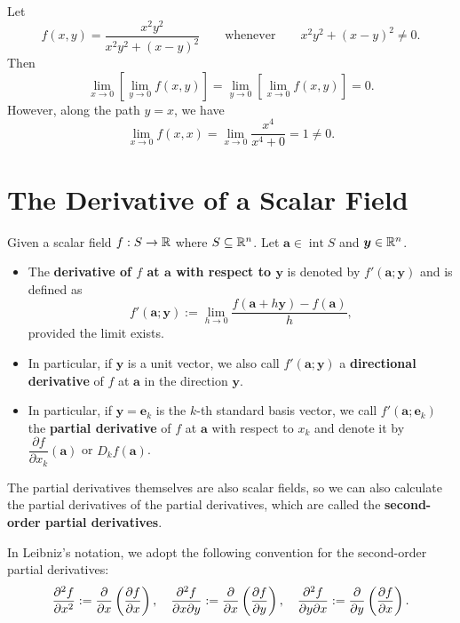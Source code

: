     \begin{exampleenv}
        Let
        \[
        f(x,y)=\frac{x^2y^2}{x^2y^2+(x-y)^2}
        \qquad \text{whenever} \qquad x^2y^2+(x-y)^2\neq 0.
        \]
        Then
        $$\lim_{x\to 0}\left[\lim_{y\to 0} f(x,y)\right]
        =
        \lim_{y\to 0}\left[\lim_{x\to 0} f(x,y)\right]
        =
        0.
        $$
        However, along the path $y=x$, we have
        $$ \lim_{x\to 0} f(x,x) = \lim_{x\to 0} \frac{x^4}{x^4 + 0} = 1 \ne 0. $$
    \end{exampleenv}
    \section{The Derivative of a Scalar Field}
    \begin{definitionenv}
        Given a scalar field $f:S\to \mathbb{R}$ where $S\subseteq \mathbb{R}^n$. Let $\bm a \in \operatorname{int} S$ and $\bm y \in \mathbb{R}^n$.
        \begin{itemize}
            \item The \textbf{derivative of $f$ at $\bm a$ with respect to $\bm y$} is denoted by $f'(\bm a; \bm y)$ and is defined as
            $$ f'(\bm a; \bm y) := \lim_{h\to 0} \frac{f(\bm a + h \bm y) - f(\bm a)}{h}, $$
            provided the limit exists.
            \item In particular, if $\bm y$ is a unit vector, we also call $f'(\bm a; \bm y)$ a \textbf{directional derivative} of $f$ at $\bm a$ in the direction $\bm y$.
            \item In particular, if $\bm y = \bm e_k$ is the $k$-th standard basis vector, we call $f'(\bm a; \bm e_k)$ the \textbf{partial derivative} of $f$ at $\bm a$ with respect to $x_k$ and denote it by $\dfrac{\partial f}{\partial x_k}(\bm a)$ or $D_k f(\bm a)$.
        \end{itemize}
    \end{definitionenv}
    \begin{remarkenv}
        The partial derivatives themselves are also scalar fields, so we can also calculate the partial derivatives of the partial derivatives, which are called the \textbf{second-order partial derivatives}.
    \end{remarkenv}
    \begin{notationenv}
        In Leibniz's notation, we adopt the following convention for the second-order partial derivatives:
        $$ \frac{\partial^2 f}{\partial x ^2} := \pdv{x}\left( \pdv{f}{x} \right), \quad \frac{\partial^2 f}{\partial x \partial y} := \pdv{x}\left( \pdv{f}{y} \right), \quad \frac{\partial^2 f}{\partial y \partial x} := \pdv{y}\left( \pdv{f}{x} \right).$$
    \end{notationenv}
